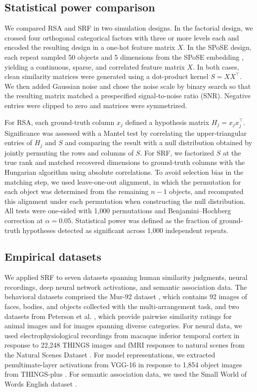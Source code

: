 \documentclass{article}
\begin{document}
\subsection{Statistical power comparison}
We compared RSA and SRF in two simulation designs. In the factorial design, we crossed four orthogonal categorical factors with three or more levels each and encoded the resulting design in a one-hot feature matrix $X$. In the SPoSE design, each repeat sampled 50 objects and 5 dimensions from the SPoSE embedding \citep{Hebart2020}, yielding a continuous, sparse, and correlated feature matrix $X$. In both cases, clean similarity matrices were generated using a dot-product kernel $S = X X^\top$. We then added Gaussian noise and chose the noise scale by binary search so that the resulting matrix matched a prespecified signal-to-noise ratio (SNR). Negative entries were clipped to zero and matrices were symmetrized.

For RSA, each ground-truth column $x_j$ defined a hypothesis matrix $H_j = x_j x_j^\top$. Significance was assessed with a Mantel test by correlating the upper-triangular entries of $H_j$ and $S$ and comparing the result with a null distribution obtained by jointly permuting the rows and columns of $S$. For SRF, we factorized $S$ at the true rank and matched recovered dimensions to ground-truth columns with the Hungarian algorithm using absolute correlations. To avoid selection bias in the matching step, we used leave-one-out alignment, in which the permutation for each object was determined from the remaining $n-1$ objects, and recomputed this alignment under each permutation when constructing the null distribution. All tests were one-sided with 1{,}000 permutations and Benjamini--Hochberg correction at $\alpha = 0.05$. Statistical power was defined as the fraction of ground-truth hypotheses detected as significant across 1{,}000 independent repeats.

\subsection{Empirical datasets}
We applied SRF to seven datasets spanning human similarity judgments, neural recordings, deep neural network activations, and semantic association data. The behavioral datasets comprised the Mur-92 dataset \citep{Mur2013}, which contains 92 images of faces, bodies, and objects collected with the multi-arrangement task, and two datasets from Peterson et al. \citep{Peterson2018}, which provide pairwise similarity ratings for animal images and for images spanning diverse categories. For neural data, we used electrophysiological recordings from macaque inferior temporal cortex in response to 22{,}248 THINGS images \citep{Papale2025} and fMRI responses to natural scenes from the Natural Scenes Dataset \citep{Allen2022}. For model representations, we extracted penultimate-layer activations from VGG-16 \citep{Simonyan2015} in response to 1{,}854 object images from THINGS-plus \citep{Stoinski2024}. For semantic association data, we used the Small World of Words English dataset \citep{DeDeyne2019}.
\end{document}
